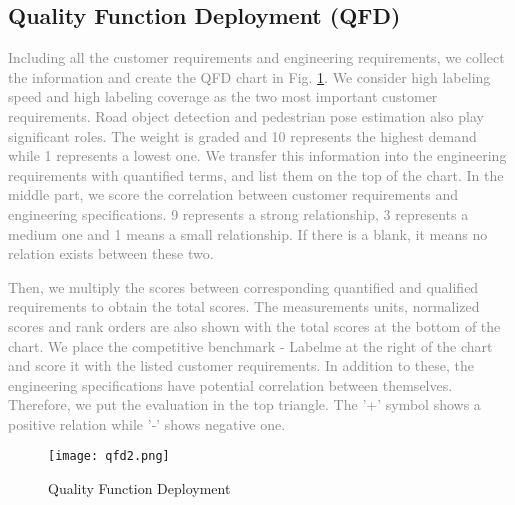 \subsection{Quality Function Deployment (QFD)}
\textcolor{gray}{Including all the customer requirements and engineering
requirements, we collect the information and create the QFD chart in Fig.
\ref{fig:qfd}. We consider high labeling speed and high labeling coverage as
the two most important customer requirements. Road object detection and
pedestrian pose estimation also play significant roles. The weight is graded
and 10 represents the highest demand while 1 represents a lowest one. We
transfer this information into the engineering requirements with quantified
terms, and list them on the top of the chart. In the middle part, we score the
correlation between customer requirements and engineering specifications. 9
represents a strong relationship, 3 represents a medium one and 1 means a small
relationship. If there is a blank, it means no relation exists between these
two.}

\textcolor{gray}{Then, we multiply the scores between corresponding quantified
and qualified requirements to obtain the total scores. The measurements units,
normalized scores and rank orders are also shown with the total scores at the
bottom of the chart. We place the competitive benchmark - Labelme at the right
of the chart and score it with the listed customer requirements. In addition to
these, the engineering specifications have potential correlation between
themselves. Therefore, we put the evaluation in the top triangle. The '+'
symbol shows a positive relation while '-' shows negative one. }
\begin{figure}[htbp]
  \centering \texttt{[image: qfd2.png]} %
  \caption{Quality Function Deployment}
  \label{fig:qfd}
\end{figure}
